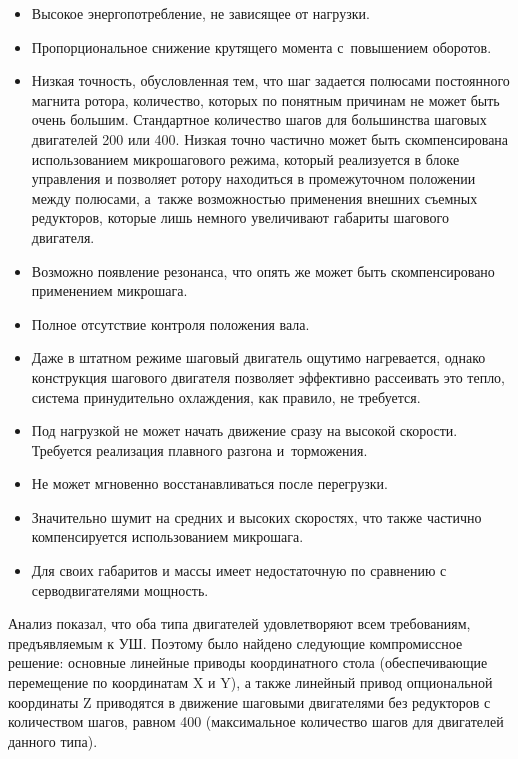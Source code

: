 \begin{itemize}
	\item Высокое энергопотребление, не зависящее от нагрузки.
	
	\item Пропорциональное снижение крутящего момента с~повышением оборотов.
	
	\item Низкая точность, обусловленная тем, что шаг задается полюсами постоянного магнита ротора, количество, которых по понятным причинам не может быть очень большим. Стандартное количество шагов для большинства шаговых двигателей 200 или 400. Низкая точно частично может быть скомпенсирована использованием микрошагового режима, который реализуется в блоке управления и позволяет ротору находиться в промежуточном положении между полюсами, а~также возможностью применения внешних съемных редукторов, которые лишь немного увеличивают габариты шагового двигателя.
	
	\item Возможно появление резонанса, что опять же может быть скомпенсировано применением микрошага.
	
	\item Полное отсутствие контроля положения вала.
	
	\item Даже в штатном режиме шаговый двигатель ощутимо нагревается, однако конструкция шагового двигателя позволяет эффективно рассеивать это тепло, система принудительно охлаждения, как правило, не требуется.
	
	\item Под нагрузкой не может начать движение сразу на высокой скорости. Требуется реализация плавного разгона и~торможения.
	
	\item Не может мгновенно восстанавливаться после перегрузки.
	
	\item Значительно шумит на средних и высоких скоростях, что также частично компенсируется использованием микрошага.
	
	\item Для своих габаритов и массы имеет недостаточную по сравнению с серводвигателями мощность.
\end{itemize}

Анализ показал, что оба типа двигателей удовлетворяют всем требованиям, предъявляемым к УШ. Поэтому было найдено следующие компромиссное решение: основные линейные приводы координатного стола (обеспечивающие перемещение по координатам X и Y), а также линейный привод опциональной координаты Z приводятся в движение шаговыми двигателями без редукторов с количеством шагов, равном 400 (максимальное количество шагов для двигателей данного типа).

